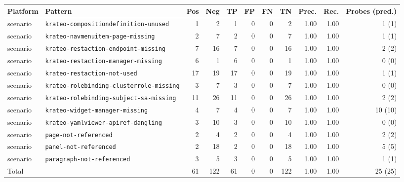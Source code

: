 \begin{tabular}{llrrrrrrrrr}
\toprule
Platform & Pattern & Pos & Neg & TP & FP & FN & TN & Prec. & Rec. & Probes (pred.) \\
\midrule
scenario & \texttt{krateo-compositiondefinition-unused} & 1 & 2 & 1 & 0 & 0 & 2 & 1.00 & 1.00 & 1 (1) \\
scenario & \texttt{krateo-navmenuitem-page-missing} & 2 & 7 & 2 & 0 & 0 & 7 & 1.00 & 1.00 & 1 (1) \\
scenario & \texttt{krateo-restaction-endpoint-missing} & 7 & 16 & 7 & 0 & 0 & 16 & 1.00 & 1.00 & 2 (2) \\
scenario & \texttt{krateo-restaction-manager-missing} & 6 & 1 & 6 & 0 & 0 & 1 & 1.00 & 1.00 & 0 (0) \\
scenario & \texttt{krateo-restaction-not-used} & 17 & 19 & 17 & 0 & 0 & 19 & 1.00 & 1.00 & 1 (1) \\
scenario & \texttt{krateo-rolebinding-clusterrole-missing} & 3 & 7 & 3 & 0 & 0 & 7 & 1.00 & 1.00 & 0 (0) \\
scenario & \texttt{krateo-rolebinding-subject-sa-missing} & 11 & 26 & 11 & 0 & 0 & 26 & 1.00 & 1.00 & 2 (2) \\
scenario & \texttt{krateo-widget-manager-missing} & 4 & 7 & 4 & 0 & 0 & 7 & 1.00 & 1.00 & 10 (10) \\
scenario & \texttt{krateo-yamlviewer-apiref-dangling} & 3 & 10 & 3 & 0 & 0 & 10 & 1.00 & 1.00 & 0 (0) \\
scenario & \texttt{page-not-referenced} & 2 & 4 & 2 & 0 & 0 & 4 & 1.00 & 1.00 & 2 (2) \\
scenario & \texttt{panel-not-referenced} & 2 & 18 & 2 & 0 & 0 & 18 & 1.00 & 1.00 & 5 (5) \\
scenario & \texttt{paragraph-not-referenced} & 3 & 5 & 3 & 0 & 0 & 5 & 1.00 & 1.00 & 1 (1) \\
\midrule
\multicolumn{2}{l}{Total} & 61 & 122 & 61 & 0 & 0 & 122 & 1.00 & 1.00 & 25 (25) \\
\bottomrule
\end{tabular}
